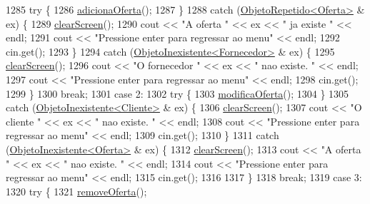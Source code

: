 \begin{DoxyCode}
1285             \textcolor{keywordflow}{try} \{
1286                 \hyperlink{classEmpresa_ae244a8ae3afb85eb5e9e5febce8b8728}{adicionaOferta}();
1287             \}
1288             \textcolor{keywordflow}{catch} (\hyperlink{classObjetoRepetido}{ObjetoRepetido<Oferta>} & ex) \{
1289                 \hyperlink{menu_8h_aceb70c1ed7e11f0863a868704f02214b}{clearScreen}();
1290                 cout << \textcolor{stringliteral}{"A oferta "} << ex << \textcolor{stringliteral}{" ja existe "} << endl;
1291                 cout << \textcolor{stringliteral}{"Pressione enter para regressar ao menu"} << endl;
1292                 cin.get();
1293             \}
1294             \textcolor{keywordflow}{catch} (\hyperlink{classObjetoInexistente}{ObjetoInexistente<Fornecedor>} & ex) \{
1295                 \hyperlink{menu_8h_aceb70c1ed7e11f0863a868704f02214b}{clearScreen}();
1296                 cout << \textcolor{stringliteral}{"O fornecedor "} << ex << \textcolor{stringliteral}{" nao existe. "} << endl;
1297                 cout << \textcolor{stringliteral}{"Pressione enter para regressar ao menu"} << endl;
1298                 cin.get();
1299             \}
1300             \textcolor{keywordflow}{break};
1301         \textcolor{keywordflow}{case} 2:
1302             \textcolor{keywordflow}{try} \{
1303                 \hyperlink{classEmpresa_ac8948065c65d5c02cb30103118f502d4}{modificaOferta}();
1304             \}
1305             \textcolor{keywordflow}{catch} (\hyperlink{classObjetoInexistente}{ObjetoInexistente<Cliente>} & ex) \{
1306                 \hyperlink{menu_8h_aceb70c1ed7e11f0863a868704f02214b}{clearScreen}();
1307                 cout << \textcolor{stringliteral}{"O cliente "} << ex << \textcolor{stringliteral}{" nao existe. "} << endl;
1308                 cout << \textcolor{stringliteral}{"Pressione enter para regressar ao menu"} << endl;
1309                 cin.get();
1310             \}
1311             \textcolor{keywordflow}{catch} (\hyperlink{classObjetoInexistente}{ObjetoInexistente<Oferta>} & ex) \{
1312                 \hyperlink{menu_8h_aceb70c1ed7e11f0863a868704f02214b}{clearScreen}();
1313                 cout << \textcolor{stringliteral}{"A oferta "} << ex << \textcolor{stringliteral}{" nao existe. "} << endl;
1314                 cout << \textcolor{stringliteral}{"Pressione enter para regressar ao menu"} << endl;
1315                 cin.get();
1316 
1317             \}
1318             \textcolor{keywordflow}{break};
1319         \textcolor{keywordflow}{case} 3:
1320             \textcolor{keywordflow}{try} \{
1321                 \hyperlink{classEmpresa_a5b5c42d733ccee37f932db5db8aec243}{removeOferta}();

\end{DoxyCode}
